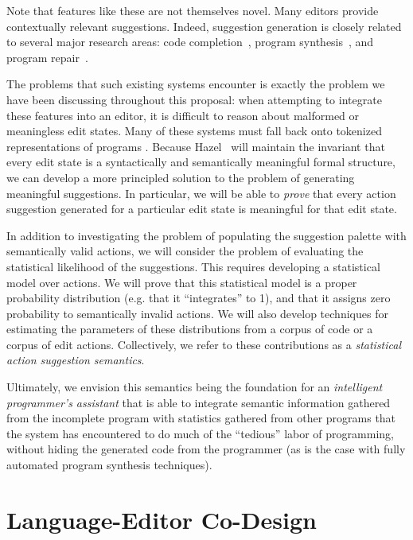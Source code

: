 \documentclass[letterpaper,USenglish]{lipics-v2016}
\newcommand{\Hazel}[0]{\textsf{Hazel}}
\newcommand{\HazelEnv}[0]{\Hazel}
\begin{document}
Note that features like these are not themselves novel. Many editors provide
contextually relevant suggestions. Indeed, suggestion generation is
closely related to several major research areas: code
completion~\cite{Muslu12icse-nier,icse-naturalness12}, program
synthesis~\cite{Gulwani2010}, and program
repair~\cite{legoues12tse,angelix,prophet,Ke15ase}. 

The problems that such existing systems encounter is exactly the problem we have 
been discussing throughout this proposal: when attempting to integrate these 
features into an editor, it is difficult to reason about malformed or meaningless
edit states. Many of these systems must fall back onto tokenized representations of programs \cite{icse-naturalness12}. Because \HazelEnv~ will maintain the invariant that every
edit state is a syntactically and semantically meaningful formal structure, we can develop a
more principled solution to the problem of generating meaningful suggestions. In particular,
we will be able to \emph{prove} that every action suggestion generated for a particular edit state is 
meaningful for that edit state.

In addition to investigating the problem of populating the suggestion palette
with semantically valid actions, we will consider the problem of evaluating
the statistical likelihood of the suggestions. This
requires developing a statistical model over actions.  We will prove that this statistical model is a
proper probability distribution (e.g. that it ``integrates'' to 1), and that it
assigns zero probability to semantically invalid actions. We will also develop techniques for estimating the parameters of these distributions from a corpus of code or a corpus of edit actions. Collectively, we refer 
to these contributions as a \emph{statistical action suggestion semantics}. 

Ultimately, we envision this semantics being the foundation for an \emph{intelligent programmer's assistant} that is able to integrate semantic information gathered from the incomplete program with statistics gathered from other programs that the system has encountered to do much of the ``tedious'' labor of programming, without hiding the generated code from the programmer (as is the case with fully automated program synthesis techniques). 

\section{Language-Editor Co-Design}
\end{document}
